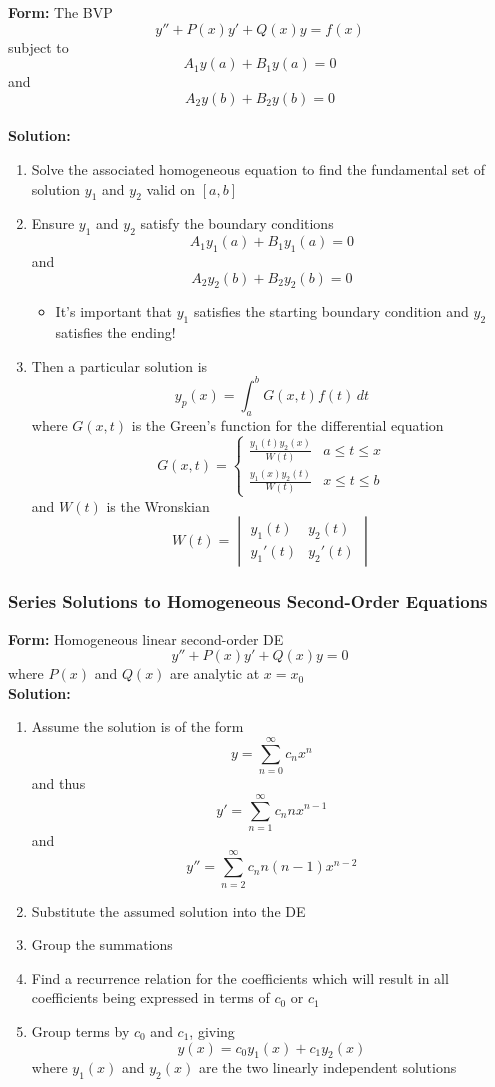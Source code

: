 \documentclass{article}
\begin{document}
\textbf{Form:} The BVP \[y'' + P(x) y' + Q(x) y = f(x)\] subject to \[A_1 y(a) + B_1 y(a) = 0\] and \[A_2 y(b) + B_2 y(b) = 0\] \\ \textbf{Solution:} \begin{enumerate}
  \item Solve the associated homogeneous equation to find the fundamental set of solution $y_1$ and $y_2$ valid on $[a, b]$

  \item Ensure $y_1$ and $y_2$ satisfy the boundary conditions \[A_1 y_1(a) + B_1 y_1(a) = 0\] and \[A_2 y_2(b) + B_2 y_2(b) = 0\]

        \begin{itemize}
          \item It's important that $y_1$ satisfies the starting boundary condition and $y_2$ satisfies the ending!
        \end{itemize}

  \item Then a particular solution is \[y_p(x) = \int_a^b G(x, t) f(t) \,dt\] where $G(x, t)$ is the Green's function for the differential equation \[G(x, t) = \begin{cases}
            \frac{y_1(t) y_2(x)}{W(t)} & a \le t \le x \\
            \frac{y_1(x) y_2(t)}{W(t)} & x \le t \le b
          \end{cases}\] and $W(t)$ is the Wronskian \[W(t) = \begin{vmatrix}
            y_1(t)  & y_2(t)  \\
            y_1'(t) & y_2'(t)
          \end{vmatrix}\]
\end{enumerate}

\subsubsection{Series Solutions to Homogeneous Second-Order Equations}

\textbf{Form:} Homogeneous linear second-order DE \[y'' + P(x) y' + Q(x) y = 0\] where $P(x)$ and $Q(x)$ are analytic at $x = x_0$ \\ \textbf{Solution:} \begin{enumerate}
  \item Assume the solution is of the form \[y = \sum_{n = 0}^\infty c_n x^n\] and thus \[y' = \sum_{n = 1}^\infty c_n n x^{n - 1}\] and \[y'' = \sum_{n = 2}^\infty c_n n (n - 1) x^{n - 2}\]

  \item Substitute the assumed solution into the DE

  \item Group the summations

  \item Find a recurrence relation for the coefficients which will result in all coefficients being expressed in terms of $c_0$ or $c_1$

  \item Group terms by $c_0$ and $c_1$, giving \[y(x) = c_0 y_1(x) + c_1 y_2(x)\] where $y_1(x)$ and $y_2(x)$ are the two linearly independent solutions
\end{enumerate}
\end{document}
